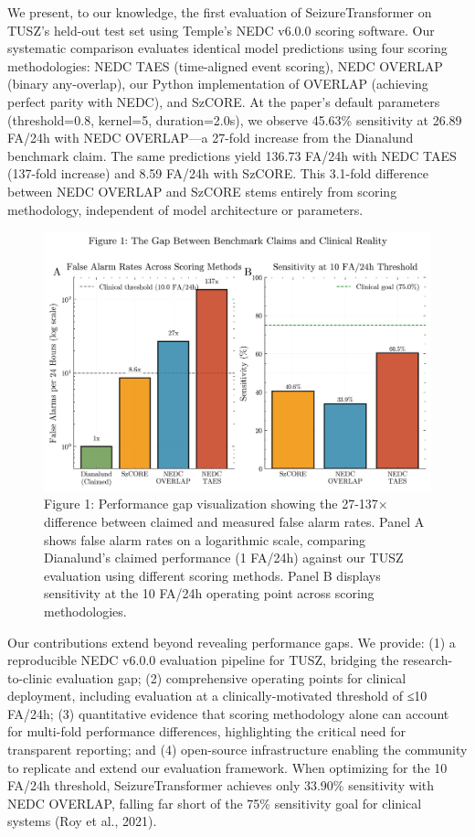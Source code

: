 \documentclass[
  10pt,
]{article}
\begin{document}
We present, to our knowledge, the first evaluation of SeizureTransformer
on TUSZ's held-out test set using Temple's NEDC v6.0.0 scoring software.
Our systematic comparison evaluates identical model predictions using
four scoring methodologies: NEDC TAES (time-aligned event scoring), NEDC
OVERLAP (binary any-overlap), our Python implementation of OVERLAP
(achieving perfect parity with NEDC), and SzCORE. At the paper's default
parameters (threshold=0.8, kernel=5, duration=2.0s), we observe 45.63\%
sensitivity at 26.89 FA/24h with NEDC OVERLAP---a 27-fold increase from
the Dianalund benchmark claim. The same predictions yield 136.73 FA/24h
with NEDC TAES (137-fold increase) and 8.59 FA/24h with SzCORE. This
3.1-fold difference between NEDC OVERLAP and SzCORE stems entirely from
scoring methodology, independent of model architecture or parameters.

\begin{figure}
\hypertarget{fig:performance-gap}{%
\centering
\includegraphics[width=1\textwidth,height=\textheight]{figures/fig1_performance_gap_optimized.png}
\caption{Figure 1: Performance gap visualization showing the 27-137×
difference between claimed and measured false alarm rates. Panel A shows
false alarm rates on a logarithmic scale, comparing Dianalund's claimed
performance (1 FA/24h) against our TUSZ evaluation using different
scoring methods. Panel B displays sensitivity at the 10 FA/24h operating
point across scoring methodologies.}\label{fig:performance-gap}
}
\end{figure}

Our contributions extend beyond revealing performance gaps. We provide:
(1) a reproducible NEDC v6.0.0 evaluation pipeline for TUSZ, bridging
the research-to-clinic evaluation gap; (2) comprehensive operating
points for clinical deployment, including evaluation at a
clinically-motivated threshold of ≤10 FA/24h; (3) quantitative evidence
that scoring methodology alone can account for multi-fold performance
differences, highlighting the critical need for transparent reporting;
and (4) open-source infrastructure enabling the community to replicate
and extend our evaluation framework. When optimizing for the 10 FA/24h
threshold, SeizureTransformer achieves only 33.90\% sensitivity with
NEDC OVERLAP, falling far short of the 75\% sensitivity goal for
clinical systems (Roy et al., 2021).
\end{document}
